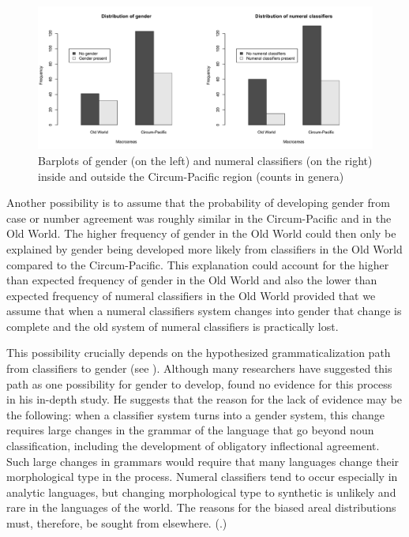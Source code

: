 \documentclass[output=collectionpaper]{langsci/langscibook}
\begin{document}
\begin{figure}
\includegraphics[width=\textwidth]{figures/13/Fig6_barplots_proofs}
\caption{Barplots of gender (on the left) and numeral classifiers (on the right) inside and outside the Circum-Pacific region (counts in genera)}
\label{fig:Sinne:6}
\end{figure}

Another possibility is to assume that the probability of developing gender from case or number agreement was roughly similar in the Circum-Pacific and in the Old World. The higher frequency of gender in the Old World could then only be explained by gender being developed more likely from classifiers in the Old World compared to the Circum-Pacific. This explanation could account for the higher than expected frequency of gender in the Old World and also the lower than expected frequency of numeral classifiers in the Old World \textendash{} provided that we assume that when a numeral classifiers system changes into gender that change is complete and the old system of numeral classifiers is practically lost.

This possibility crucially depends on the hypothesized grammaticalization path from classifiers to gender (see ). Although many researchers have suggested this path as one possibility for gender to develop, \citet[346]{Passer2016b} found no evidence for this process in his in-depth study. He suggests that the reason for the lack of evidence may be the following: when a classifier system turns into a gender system, this change requires large changes in the grammar of the language that go beyond noun classification, including the development of obligatory inflectional agreement. Such large changes in grammars would require that many languages change their morphological type in the process. Numeral classifiers tend to occur especially in analytic languages, but changing morphological type to synthetic is unlikely and rare in the languages of the world. The reasons for the biased areal distributions must, therefore, be sought from elsewhere. (\citealt{Passer2016b}.)
\end{document}
